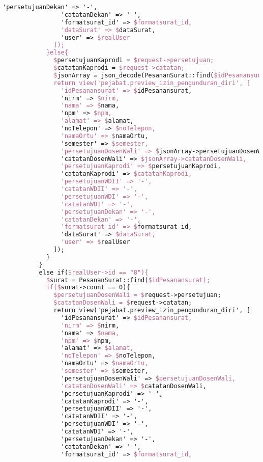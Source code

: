 \begin{lstlisting}[language=tex,basicstyle=\tiny,caption=PesanansuratController.php]
                'persetujuanDekan' => '-',
                'catatanDekan' => '-',
                'formatsurat_id' => $formatsurat_id,
                'dataSurat' => $dataSurat,
                'user' => $realUser
              ]);
            }else{
              $persetujuanKaprodi = $request->persetujuan;
              $catatanKaprodi = $request->catatan;
              $jsonArray = json_decode(PesananSurat::find($idPesanansurat)->dataSurat);
              return view('pejabat.preview_izin_pengunduran_diri', [
                'idPesanansurat' => $idPesanansurat,
                'nirm' => $nirm,
                'nama' => $nama,
                'npm' => $npm,
                'alamat' => $alamat,
                'noTelepon' => $noTelepon,
                'namaOrtu' => $namaOrtu,
                'semester' => $semester,
                'persetujuanDosenWali' => $jsonArray->persetujuanDosenWali,
                'catatanDosenWali' => $jsonArray->catatanDosenWali,
                'persetujuanKaprodi' => $persetujuanKaprodi,
                'catatanKaprodi' => $catatanKaprodi,
                'persetujuanWDII' => '-',
                'catatanWDII' => '-',
                'persetujuanWDI' => '-',
                'catatanWDI' => '-',
                'persetujuanDekan' => '-',
                'catatanDekan' => '-',
                'formatsurat_id' => $formatsurat_id,
                'dataSurat' => $dataSurat,
                'user' => $realUser
              ]);
            }
          }
          else if($realUser->id == "8"){
            $surat = PesananSurat::find($idPesanansurat);
            if($surat->count == 0){
              $persetujuanDosenWali = $request->persetujuan;
              $catatanDosenWali = $request->catatan;
              return view('pejabat.preview_izin_pengunduran_diri', [
                'idPesanansurat' => $idPesanansurat,
                'nirm' => $nirm,
                'nama' => $nama,
                'npm' => $npm,
                'alamat' => $alamat,
                'noTelepon' => $noTelepon,
                'namaOrtu' => $namaOrtu,
                'semester' => $semester,
                'persetujuanDosenWali' => $persetujuanDosenWali,
                'catatanDosenWali' => $catatanDosenWali,
                'persetujuanKaprodi' => '-',
                'catatanKaprodi' => '-',
                'persetujuanWDII' => '-',
                'catatanWDII' => '-',
                'persetujuanWDI' => '-',
                'catatanWDI' => '-',
                'persetujuanDekan' => '-',
                'catatanDekan' => '-',
                'formatsurat_id' => $formatsurat_id,

\end{lstlisting}
